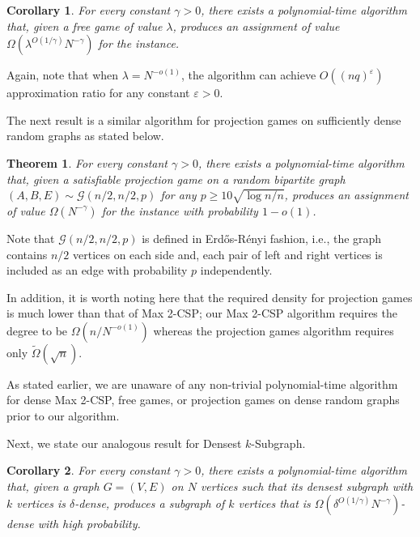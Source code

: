 \documentclass{article}
\newtheorem{theorem}{Theorem}
\newtheorem{corollary}{Corollary}
\begin{document}
\begin{corollary} \label{cor:free-game}
  For every constant $\gamma > 0$, there exists a polynomial-time algorithm that, given a free game of value $\lambda$, produces an assignment of value $\Omega(\lambda^{O(1/\gamma)}N^{-\gamma})$ for the instance.
\end{corollary}

Again, note that when $\lambda = N^{-o(1)}$, the algorithm can achieve $O((nq)^\varepsilon)$ approximation ratio for any constant $\varepsilon > 0$.

The next result is a similar algorithm for projection games on sufficiently dense random graphs as stated below. \\

\begin{theorem} \label{thm:dense-random-proj}
  For every constant $\gamma > 0$, there exists a polynomial-time algorithm that, given a satisfiable projection game on a random bipartite graph $(A, B, E) \sim \mathcal{G}(n/2, n/2, p)$ for any $p \geq 10\sqrt{\log n / n}$, produces an assignment of value $\Omega(N^{-\gamma})$ for the instance with probability $1 - o(1)$.
\end{theorem}

Note that $\mathcal{G}(n/2, n/2, p)$ is defined in Erd\H{o}s-R\'{e}nyi fashion, i.e., the graph contains $n/2$ vertices on each side and, each pair of left and right vertices is included as an edge with probability $p$ independently.

In addition, it is worth noting here that the required density for projection games is much lower than that of {\sc Max 2-CSP}; our {\sc Max 2-CSP} algorithm requires the degree to be $\Omega(n/N^{-o(1)})$ whereas the projection games algorithm requires only $\tilde{\Omega}(\sqrt{n})$.

As stated earlier, we are unaware of any non-trivial polynomial-time algorithm for dense {\sc Max 2-CSP}, free games, or projection games on dense random graphs prior to our algorithm.

Next, we state our analogous result for {\sc Densest $k$-Subgraph}. \\

\begin{corollary} \label{cor:dks}
  For every constant $\gamma > 0$, there exists a polynomial-time algorithm that, given a graph $G = (V, E)$ on $N$ vertices such that its densest subgraph with $k$ vertices is $\delta$-dense, produces a subgraph of $k$ vertices that is $\Omega(\delta^{O(1/\gamma)}N^{-\gamma})$-dense with high probability.
\end{corollary}
\end{document}

